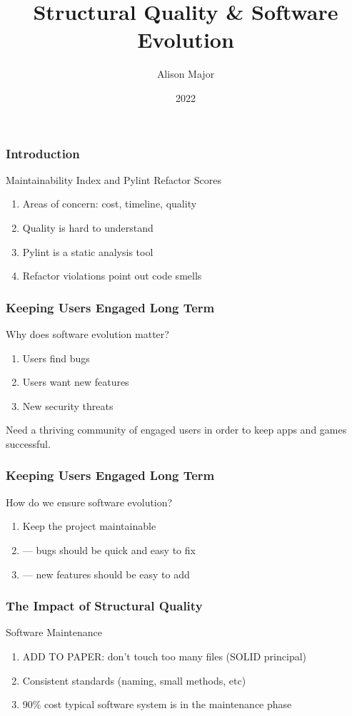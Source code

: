\documentclass{beamer}
\title{Structural Quality \& Software Evolution}
\author{Alison Major}
\institute{Lewis University}
\date{2022}
\begin{document}
\frame{\titlepage}

\begin{frame}
  \frametitle{Introduction}
  Maintainability Index and Pylint Refactor Scores
  \begin{enumerate}
    \item Areas of concern: cost, timeline, quality
    \item Quality is hard to understand
    \item Pylint is a static analysis tool
    \item Refactor violations point out code smells
  \end{enumerate}
\end{frame}


\begin{frame}
  \frametitle{Keeping Users Engaged Long Term}
  Why does software evolution matter?
  \begin{enumerate}
    \item Users find bugs
    \item Users want new features
    \item New security threats
  \end{enumerate}
  Need a thriving community of engaged users in order to keep apps and games successful.
\end{frame}

\begin{frame}
  \frametitle{Keeping Users Engaged Long Term}
  How do we ensure software evolution?
  \begin{enumerate}
    \item Keep the project maintainable
    \item --- bugs should be quick and easy to fix
    \item --- new features should be easy to add
  \end{enumerate}
\end{frame}

\begin{frame}
  \frametitle{The Impact of Structural Quality}
  Software Maintenance
  \begin{enumerate}
    \item ADD TO PAPER: don't touch too many files (SOLID principal)
    \item Consistent standards (naming, small methods, etc)
    \item 90\% cost typical software system is in the maintenance phase
  \end{enumerate}
\end{frame}
\end{document}
